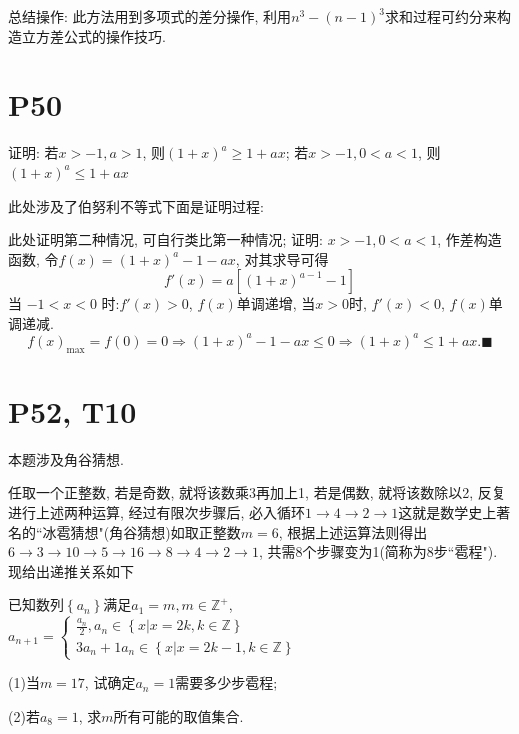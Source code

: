 \documentclass{book}
\begin{document}
    总结操作: 此方法用到多项式的\textcolor[rgb]{0.75,0.17,0.22}{差分}操作, 利用$n^3-(n-1)^3$求和过程可约分来构造立方差公式的操作技巧.
    \section{\textcolor[rgb]{0.11,0.65,0.52}{P50}}
    \begin{boxB}
        证明: 若$x>-1,a>1$, 则$\displaystyle \left( 1+x \right)^a\ge 1+ax$; 若$x>-1,0<a<1$, 则$\displaystyle \left( 1+x \right)^a\le 1+ax$
    \end{boxB}
    此处涉及了\textcolor[rgb]{0.38,0.11,0.2}{伯努利不等式}下面是证明过程:

    此处证明第二种情况, 可自行类比第一种情况; 证明: $x>-1,0<a<1$, \textcolor[rgb]{0.75,0.17,0.22}{作差构造函数}, 令$\displaystyle f(x)=\left( 1+x \right)^a-1-ax$, 对其求导可得$$f'(x)=a\left[ \left( 1+x \right)^{a-1}-1 \right]$$
    当 $-1<x<0$ 时:$f'(x)>0$, $f(x)$单调递增, 当$x>0$时, $f'(x)<0$, $f(x)$单调递减.
    $$f(x)_{\max }=f(0)=0\Longrightarrow \left( 1+x \right)^a-1-ax\le 0\Longrightarrow \left( 1+x \right)^a\le 1+ax.\blacksquare$$

    \section{\textcolor[rgb]{0.11,0.65,0.52}{P52, T10}}

    本题涉及\textcolor[rgb]{0.38,0.11,0.2}{角谷猜想}.

    任取一个正整数, 若是奇数, 就将该数乘3再加上1, 若是偶数, 就将该数除以2, 反复进行上述两种运算, 经过有限次步骤后, 必入循环$1\rightarrow 4\rightarrow 2\rightarrow 1$这就是数学史上著名的``冰雹猜想"(角谷猜想)如取正整数$m=6$, 根据上述运算法则得出$6\rightarrow 3\rightarrow 10\rightarrow 5\rightarrow 16\rightarrow 8\rightarrow 4\rightarrow 2\rightarrow 1$, 共需8个步骤变为1(简称为8步``雹程"). 现给出递推关系如下
    
    已知数列$\left\{ a_n \right\}$满足$a_1=m,m\in \mathbb{Z}^+$,$\displaystyle a_{n+1}=\left\{\begin{matrix} 
        \displaystyle \frac{a_n}{2},a_n\in\left \{ x|x=2k,k\in \mathbb{Z}  \right \}    \\  
        3a_n+1 a_n\in\left \{ x|x=2k-1,k\in \mathbb{Z}  \right \}
      \end{matrix}\right. $
    
    (1)当$m=17$, 试确定$a_n=1$需要多少步雹程;

    (2)若$a_8=1$, 求$m$所有可能的取值集合.
\end{document}
